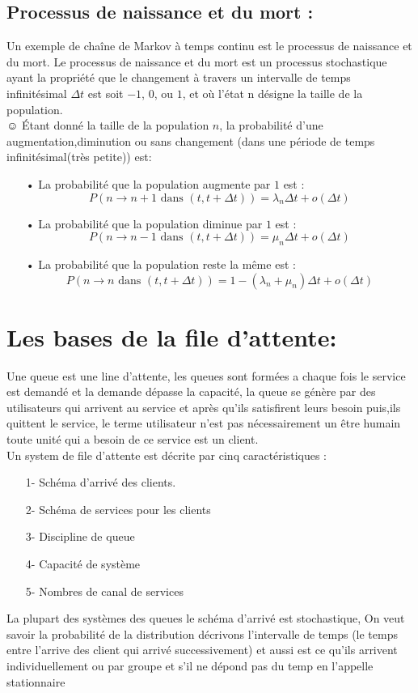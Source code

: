 \documentclass[a4paper,12pt]{report}
\begin{document}
\subsection{Processus de naissance et du mort :}
Un exemple de chaîne de Markov à temps continu est le processus de naissance et du mort. Le processus de naissance et du mort est un processus stochastique ayant la propriété que le changement à travers un intervalle de temps infinitésimal $\Delta t$ est soit $-1$, $0$, ou $1$, et où l'état n
désigne la taille de la population.\\☺
Étant donné la taille de la population $n$, la probabilité d'une augmentation,diminution ou sans changement (dans une période de temps infinitésimal(très petite)) est:
\begin{itemize}
\item[•] La probabilité que la population augmente par $1$ est :
\[P(n\rightarrow n+1 \text{ dans }(t,t+\Delta t))=\lambda_n\Delta t+o(\Delta t)\]
\item[•] La probabilité que la population diminue par $1$ est :
\[P(n\rightarrow n-1 \text{ dans }(t,t+\Delta t))=\mu_n\Delta t+o(\Delta t)\]
\item[•] La probabilité que la population reste la même est :
\[P(n\rightarrow n \text{ dans }(t,t+\Delta t))=1-(\lambda_n+\mu_n)\Delta t+o(\Delta t)\]
\end{itemize}
 \section{Les bases de la file d'attente:}
 Une queue est une line d’attente, les queues sont formées a chaque fois le service est demandé et la demande dépasse la capacité, la queue se génère par des utilisateurs qui arrivent au service et après qu’ils satisfirent leurs besoin puis,ils quittent le service, le terme utilisateur n’est pas nécessairement un être humain toute unité qui a besoin de ce service est un client. \\
Un system de file d’attente est décrite par cinq caractéristiques :
\begin{enumerate}
\item[1-]Schéma d’arrivé des clients.
\item[2-]Schéma de services pour les clients 
\item[3-]Discipline de queue
\item[4-]Capacité de système 
\item[5-]Nombres de canal de services
\end{enumerate} 	
La plupart des systèmes des queues   le schéma d’arrivé est stochastique, On veut savoir la probabilité de la distribution décrivons l’intervalle de temps (le temps entre l’arrive des client qui arrivé successivement) et aussi est ce qu’ils arrivent individuellement ou par groupe et s’il ne dépond pas du temp en l’appelle stationnaire 
\end{document}
